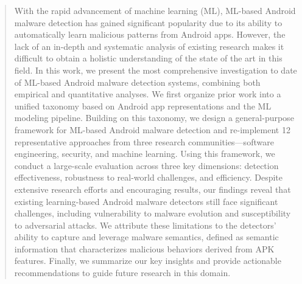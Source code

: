 \documentclass[manuscript,screen]{acmart}
\begin{document}


\renewcommand{\shortauthors}{Jiahao Liu et al.}
\begin{abstract}
With the rapid advancement of machine learning (ML), ML-based Android malware detection has gained significant popularity due to its ability to automatically learn malicious patterns from Android apps.
However, the lack of an in-depth and systematic analysis of existing research makes it difficult to obtain a holistic understanding of the state of the art in this field.
In this work, we present the most comprehensive investigation to date of ML-based Android malware detection systems, combining both empirical and quantitative analyses.
We first organize prior work into a unified taxonomy based on Android app representations and the ML modeling pipeline.
Building on this taxonomy, we design a general-purpose framework for ML-based Android malware detection and re-implement 12 representative approaches from three research communities—software engineering, security, and machine learning.
Using this framework, we conduct a large-scale evaluation across three key dimensions: detection effectiveness, robustness to real-world challenges, and efficiency.
Despite extensive research efforts and encouraging results, our findings reveal that existing learning-based Android malware detectors still face significant challenges, including vulnerability to malware evolution and susceptibility to adversarial attacks.
We attribute these limitations to the detectors' ability to capture and leverage malware semantics, defined as semantic information that characterizes malicious behaviors derived from APK features.
Finally, we summarize our key insights and provide actionable recommendations to guide future research in this domain.


\end{abstract}
\end{document}
